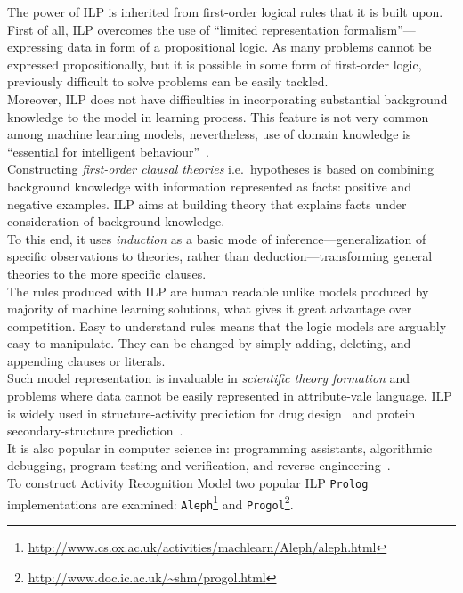 \documentclass[12pt, a4paper, pdflatex, leqno, twoside, openright]{report}
\begin{document}
The power of ILP is inherited from first-order logical rules that it is built upon. First of all, ILP overcomes the use of ``limited representation formalism''---expressing data in form of a propositional logic. As many problems cannot be expressed propositionally, but it is possible in some form of first-order logic, previously difficult to solve problems can be easily tackled.\\
Moreover, ILP does not have difficulties in incorporating substantial background knowledge to the model in learning process. This feature is not very common among machine learning models, nevertheless, use of domain knowledge is ``essential for intelligent behaviour''~\citep{muggleton1994inductive}.\\

Constructing \emph{first-order clausal theories} i.e.\ hypotheses is based on combining background knowledge with information represented as facts: positive and negative examples. ILP aims at building theory that explains facts under consideration of background knowledge.\\
To this end, it uses \emph{induction} as a basic mode of inference---generalization of specific observations to theories, rather than deduction---transforming general theories to the more specific clauses.\\

The rules produced with ILP are human readable unlike models produced by majority of machine learning solutions, what gives it great advantage over competition. Easy to understand rules means that the logic models are arguably easy to manipulate. They can be changed by simply adding, deleting, and appending clauses or literals.\\

Such model representation is invaluable in \emph{scientific theory formation} and problems where data cannot be easily represented in attribute-vale language. ILP is widely used in structure-activity prediction for drug design~\citep{king1992drug,michael1992modelling} and protein secondary-structure prediction~\citep{muggleton1992protein}.\\
It is also popular in computer science in: programming assistants, algorithmic debugging, program testing and verification, and reverse engineering~\citep{shapiro1983algorithmic,bergadno1993inductive,bratko1993inductive}.\\

To construct Activity Recognition Model two popular ILP \texttt{Prolog} implementations are examined: \texttt{Aleph}\footnote{\url{http://www.cs.ox.ac.uk/activities/machlearn/Aleph/aleph.html}} and \texttt{Progol}\footnote{\url{http://www.doc.ic.ac.uk/~shm/progol.html}}.
\end{document}
